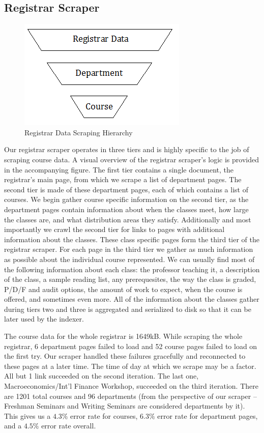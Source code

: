 \documentclass[12pt,letterpaper]{article}
\begin{document}
\subsection{Registrar Scraper}

\begin{figure}
\begin{center}
\includegraphics{RegistrarDiagram.png}
\end{center}
\caption{Registrar Data Scraping Hierarchy}
\end{figure}

Our registrar scraper operates in three tiers and is highly specific to the job of scraping course data. A visual overview of the registrar scraper's logic is provided in the accompanying figure. The first tier contains a single document, the registrar's main page, from which we scrape a list of department pages. The second tier is made of these department pages, each of which contains a list of courses. We begin gather course specific information on the second tier, as the department pages contain information about when the classes meet, how large the classes are, and what distribution areas they satisfy. Additionally and most importantly we crawl the second tier for links to pages with additional information about the classes. These class specific pages form the third tier of the registrar scraper. For each page in the third tier we gather as much information as possible about the individual course represented. We can usually find most of the following information about each class: the professor teaching it, a description of the class, a sample reading list, any prerequesites, the way the class is graded, P/D/F and audit options, the amount of work to expect, when the course is offered, and sometimes even more. All of the information about the classes gather during tiers two and three is aggregated and serialized to disk so that it can be later used by the indexer.

The course data for the whole registrar is 1649kB. While scraping the whole registrar, 6 department pages failed to load and 52 course pages failed to load on the first try. Our scraper handled these failures gracefully and reconnected to these pages at a later time. The time of day at which we scrape may be a factor. All but 1 link succeeded on the second iteration. The last one, Macroeconomics/Int'l Finance Workshop, succeeded on the third iteration. There are 1201 total courses and 96 departments (from the perspective of our scraper -- Freshman Seminars and Writing Seminars are considered departments by it). This gives us a $4.3\%$ error rate for courses, $6.3\%$ error rate for department pages, and a $4.5\%$ error rate overall. 
\end{document}
